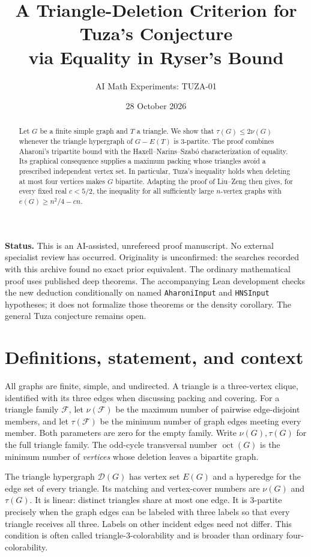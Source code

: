 \documentclass[11pt]{article}
\title{A Triangle-Deletion Criterion for Tuza's Conjecture\\via Equality in Ryser's Bound}
\author{AI Math Experiments: TUZA-01}
\date{28 October 2026}
\newcommand{\D}{\mathcal D}
\newcommand{\oct}{\operatorname{oct}}
\begin{document}
\maketitle
\begin{abstract}
Let $G$ be a finite simple graph and $T$ a triangle. We show that
$\tau(G)\le2\nu(G)$ whenever the triangle hypergraph of $G-E(T)$ is
3-partite. The proof combines Aharoni's tripartite bound with the
Haxell--Narins--Szab\'o characterization of equality. Its graphical
consequence supplies a maximum packing whose triangles avoid a prescribed
independent vertex set. In particular, Tuza's inequality holds when deleting
at most four vertices makes $G$ bipartite. Adapting the proof of Liu--Zeng
then gives, for every fixed real $c<5/2$, the inequality for all sufficiently
large $n$-vertex graphs with $e(G)\ge n^2/4-cn$.
\end{abstract}
\noindent\textbf{Status.} This is an AI-assisted, unrefereed proof manuscript.
No external specialist review has occurred. Originality is unconfirmed:
the searches recorded with this archive found no exact prior equivalent.
The ordinary mathematical proof uses published deep theorems. The accompanying
Lean development checks the new deduction conditionally on named
\texttt{AharoniInput} and \texttt{HNSInput} hypotheses; it does not formalize
those theorems or the density corollary. The general Tuza conjecture remains open.

\section{Definitions, statement, and context}
All graphs are finite, simple, and undirected. A triangle is a three-vertex
clique, identified with its three edges when discussing packing and covering.
For a triangle family $\mathcal F$, let $\nu(\mathcal F)$ be the maximum
number of pairwise edge-disjoint members, and let $\tau(\mathcal F)$ be the
minimum number of graph edges meeting every member. Both parameters are zero
for the empty family. Write $\nu(G),\tau(G)$ for the full triangle family.
The odd-cycle transversal number $\oct(G)$ is the minimum number of
\emph{vertices} whose deletion leaves a bipartite graph.

The triangle hypergraph $\D(G)$ has vertex set $E(G)$ and a hyperedge for
the edge set of every triangle. Its matching and vertex-cover numbers are
$\nu(G)$ and $\tau(G)$. It is linear: distinct triangles share at most one
edge. It is 3-partite precisely when the graph edges can be labeled with
three labels so that every triangle receives all three. Labels on other
incident edges need not differ. This condition is often called
triangle-3-colorability and is broader than ordinary four-colorability.
\end{document}
